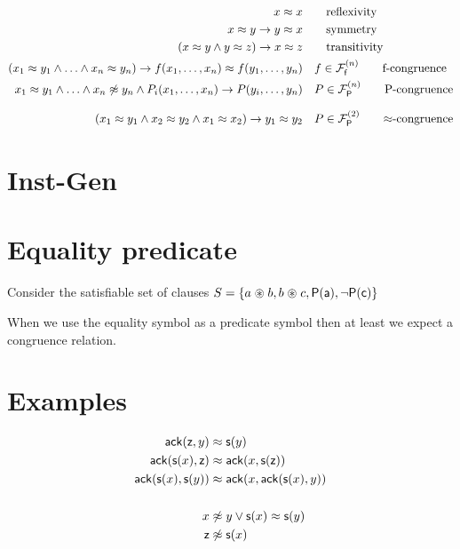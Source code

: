 \begin{align*}
	x \mEQ x & \tag*{reflexivity} 
	\\
	x \mEQ y \limp y \mEQ x & \tag*{symmetry}
	\\
	(x\mEQ y\land y\mEQ z)\limp x\mEQ z & \tag*{transitivity} 
	\\
	(x_1 \mEQ y_1\land\ldots\land x_n \mEQ y_n)\limp f(x_1,\ldots,x_n)\mEQ f(y_1,\ldots,y_n) &\quad f\in\mcFfn
	\tag*{f-congruence}
	\\
	x_1\mEQ y_1\land\ldots\land x_n\mNE y_n\land P_i(x_1,\ldots,x_n)
	\limp P(y_i,\ldots,y_n) &\quad P\in\mcFPn
	\tag*{P-congruence}
	\\[0.7em]
	(x_1\mEQ y_1
	\land x_2\mEQ y_2
	\land x_1\mEQ x_2)
	\limp y_1\mEQ y_2
	& \quad P\in\mcFPn[2]
		\tag*{$\mEQ$-congruence}
\end{align*}
	
	



\section{Inst-Gen}

\section{Equality predicate}

Consider the satisfiable set of clauses $S = \{a \mathrel{\circledast} b, b \mathrel{\circledast} c, {\mathsf P}({\mathsf a}), \lnot {\mathsf P}({\mathsf c}) \}$

When we use the equality symbol as a predicate symbol 
then at least we expect a congruence relation.

\section{Examples}

\begin{example}
	\begin{align*}
	\mathsf{ack}({\mathsf z},y) &\approx {\mathsf s}(y) \\
	\mathsf{ack}({\mathsf s}(x),{\mathsf z}) &\approx \mathsf{ack}(x, {\mathsf s}({\mathsf z})) \\
	\mathsf{ack}({\mathsf s}(x),{\mathsf s}(y)) &\approx \mathsf{ack}(x, \mathsf{ack}({\mathsf s}(x),y)) \\
	\\
	x &\not\approx y \lor {\mathsf s}(x) \approx {\mathsf s}(y)\\
	{\mathsf z} &\not\approx {\mathsf s}(x)\\
	\end{align*}
\end{example}



